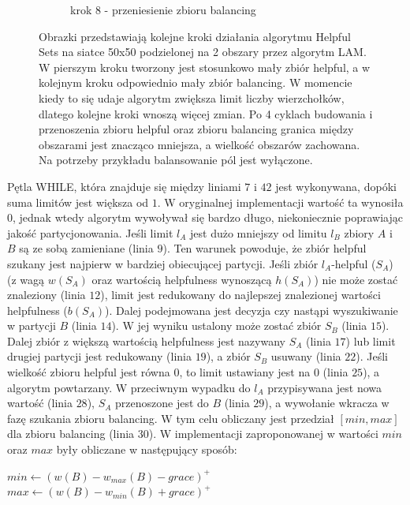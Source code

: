 \begin{figure}[h]
\begin{subfigure}{.5\textwidth}
    \caption[short]{krok 8 - przeniesienie zbioru balancing}
\end{subfigure}
\caption{Obrazki przedstawiają kolejne kroki działania algorytmu Helpful Sets na siatce 50x50 podzielonej na 2 obszary
przez algorytm LAM. W pierszym kroku tworzony jest stosunkowo mały zbiór helpful, a w kolejnym kroku odpowiednio mały zbiór balancing.
W momencie kiedy to się udaje algorytm zwiększa limit liczby wierzchołków, dlatego kolejne kroki wnoszą więcej zmian.
Po 4 cyklach budowania i przenoszenia zbioru helpful oraz zbioru balancing granica między obszarami jest znacząco mniejsza, a wielkość obszarów
zachowana. Na potrzeby przykładu balansowanie pól jest wyłączone.}
\label{im:h_steps}
\end{figure}
\FloatBarrier

Pętla WHILE, która znajduje się między liniami $7$ i $42$ jest wykonywana, dopóki suma limitów jest większa od $1$.
W oryginalnej implementacji wartość ta wynosiła $0$, jednak wtedy algorytm wywoływał się bardzo długo,
niekoniecznie poprawiając jakość partycjonowania.
Jeśli limit $l_A$ jest dużo mniejszy od limitu $l_B$ zbiory $A$ i $B$ są ze sobą zamieniane (linia $9$).
Ten warunek powoduje, że zbiór helpful szukany jest najpierw w bardziej obiecującej partycji.
Jeśli zbiór $l_A$-helpful ($S_A$) (z wagą $w(S_A)$ oraz wartością helpfulness wynoszącą $h(S_A)$) nie może zostać
znaleziony (linia $12$), limit jest redukowany do najlepszej znalezionej wartości helpfulness ($b(S_A)$).
Dalej podejmowana jest decyzja czy nastąpi wyszukiwanie w partycji $B$ (linia $14$).
W jej wyniku ustalony może zostać zbiór $S_B$ (linia $15$).
Dalej zbiór z większą wartością helpfulness jest nazywany $S_A$ (linia $17$) lub limit
drugiej partycji jest redukowany (linia $19$), a zbiór $S_B$ usuwany (linia $22$).
Jeśli wielkość zbioru helpful jest równa $0$, to limit ustawiany jest na $0$ (linia $25$), a algorytm powtarzany.
W przeciwnym wypadku do $l_A$ przypisywana jest nowa wartość (linia $28$), $S_A$ przenoszone jest do $B$ (linia $29$),
a wywołanie wkracza w fazę szukania zbioru balancing.
W tym celu obliczany jest przedział $[min, max]$ dla zbioru balancing (linia $30$).
W implementacji zaproponowanej w \cite{1364754} wartości $min$ oraz $max$ były obliczane w następujący sposób:
\vspace{-3mm}
\begin{pseudocode}
$min \leftarrow (w(B) - w_{max}(B) - grace)^+$
$max \leftarrow (w(B) - w_{min}(B) + grace)^+$
\end{pseudocode}
\vspace{-13mm}
